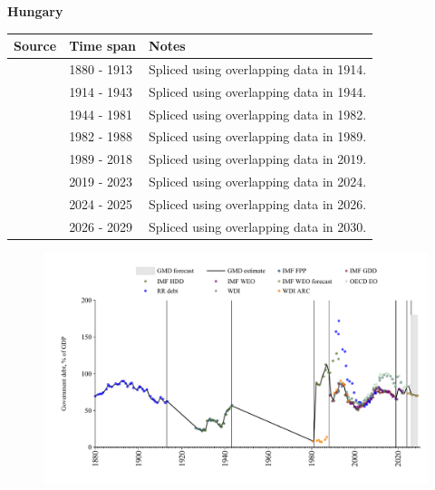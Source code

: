 \documentclass[12pt,a4paper,landscape]{article}
\begin{document}
\begin{adjustbox}{max totalsize={\paperwidth}{\paperheight},center}
\begin{minipage}[t][\textheight][t]{\textwidth}
\vspace*{0.5cm}
{}
\begin{center}
{\Large\bfseries Hungary}
\end{center}
\vspace{0.5cm}
\begin{table}[H]
\centering
\small
\begin{tabular}{|l|l|l|}
\hline
\textbf{Source} & \textbf{Time span} & \textbf{Notes} \\
\hline
\rowcolor{white}\cite{RR_debt}& 1880 - 1913 &Spliced using overlapping data in 1914.\\
\rowcolor{lightgray}\cite{IMF_FPP}& 1914 - 1943 &Spliced using overlapping data in 1944.\\
\rowcolor{white}\cite{WDI_ARC}& 1944 - 1981 &Spliced using overlapping data in 1982.\\
\rowcolor{lightgray}\cite{IMF_HDD}& 1982 - 1988 &Spliced using overlapping data in 1989.\\
\rowcolor{white}\cite{IMF_GDD}& 1989 - 2018 &Spliced using overlapping data in 2019.\\
\rowcolor{lightgray}\cite{IMF_FPP}& 2019 - 2023 &Spliced using overlapping data in 2024.\\
\rowcolor{white}\cite{OECD_EO}& 2024 - 2025 &Spliced using overlapping data in 2026.\\
\rowcolor{lightgray}\cite{IMF_WEO_forecast}& 2026 - 2029 &Spliced using overlapping data in 2030.\\
\hline
\end{tabular}
\end{table}
\begin{figure}[H]
\centering
\includegraphics[width=\textwidth,height=0.6\textheight,keepaspectratio]{graphs/HUN_govdebt_GDP.pdf}
\end{figure}
\end{minipage}
\end{adjustbox}
\end{document}

